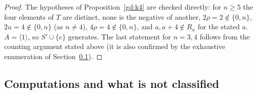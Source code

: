 \documentclass[preprint,11pt]{elsarticle}
\theoremstyle{definition}
\theoremstyle{remark}
\begin{document}
\begin{proof}
The hypotheses of Proposition~\ref{gd:k4} are checked directly: for $n\ge5$ the four elements of $T$ are distinct, none is the negative of another, $2\rho=2\notin\{0,n\}$, $2u=4\notin\{0,n\}$ (as $n\ne4$), $4\rho=4\notin\{0,n\}$, and $a,a+4\notin R_u$ for the stated $a$. $A=\langle1\rangle$, so $S'\cup\{c\}$ generates. The last statement for $n=3,4$ follows from the counting argument stated above (it is also confirmed by the exhaustive enumeration of Section~\ref{sec:gd-comp}).
\end{proof}

\subsection{Computations and what is not classified}\label{sec:gd-comp}
\end{document}
